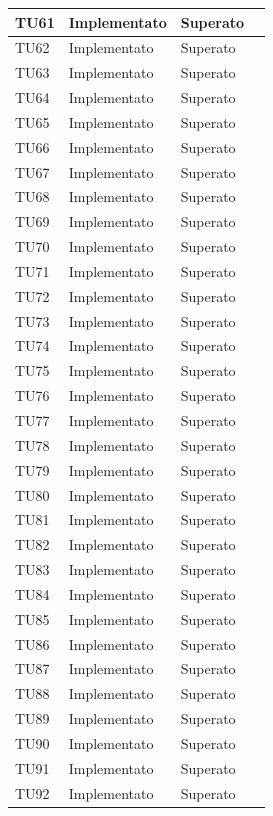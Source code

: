\begin{longtable}{|>{\centering\arraybackslash}m{1.6cm}|>{\centering\arraybackslash}m{6.41cm}|>{\centering\arraybackslash}m{3.1cm}| c |}
	TU61 & Implementato & Superato  \\ \hline
	TU62 & Implementato & Superato  \\ \hline
	TU63 & Implementato & Superato  \\ \hline
	TU64 & Implementato & Superato  \\ \hline
	TU65 & Implementato & Superato  \\ \hline
	TU66 & Implementato & Superato  \\ \hline
	TU67 & Implementato & Superato  \\ \hline
	TU68 & Implementato & Superato  \\ \hline
	TU69 & Implementato & Superato  \\ \hline
	TU70 & Implementato & Superato  \\ \hline
	TU71 & Implementato & Superato  \\ \hline
	TU72 & Implementato & Superato  \\ \hline
	TU73 & Implementato & Superato  \\ \hline
	TU74 & Implementato & Superato  \\ \hline
	TU75 & Implementato & Superato  \\ \hline
	TU76 & Implementato & Superato  \\ \hline
	TU77 & Implementato & Superato  \\ \hline
	TU78 & Implementato & Superato  \\ \hline
	TU79 & Implementato & Superato  \\ \hline
	TU80 & Implementato & Superato  \\ \hline
	TU81 & Implementato & Superato  \\ \hline
	TU82 & Implementato & Superato  \\ \hline
	TU83 & Implementato & Superato  \\ \hline
	TU84 & Implementato & Superato  \\ \hline
	TU85 & Implementato & Superato  \\ \hline
	TU86 & Implementato & Superato  \\ \hline
	TU87 & Implementato & Superato  \\ \hline
	TU88 & Implementato & Superato  \\ \hline
	TU89 & Implementato & Superato  \\ \hline
	TU90 & Implementato & Superato  \\ \hline
	TU91 & Implementato & Superato  \\ \hline
	TU92 & Implementato & Superato  \\ \hline

\end{longtable}
